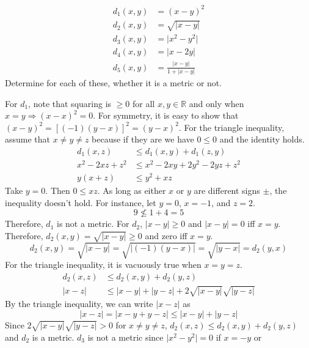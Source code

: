 \begin{enumerate}
  \begin{align*}
    d_1(x, y) & = (x - y)^2\\
    d_2(x, y) & = \sqrt{\lvert x - y\rvert}\\
    d_3(x, y) & = \lvert x^2 - y^2\rvert\\
    d_4(x, y) & = \lvert x - 2y\rvert\\
    d_5(x, y) & = \frac{\lvert x - y\rvert}{1 + \lvert x - y\rvert}
  \end{align*}
  Determine for each of these, whether it is a metric or not.
  \par\smallskip
  For \(d_1\), note that squaring is \(\geq 0\) for all \(x,y\in\mathbb{R}\)
  and only when \(x = y\Rightarrow (x - x)^2 = 0\).
  For symmetry, it is easy to show that
  \((x - y)^2 = [(-1)(y - x)]^2 = (y - x)^2\).
  For the triangle inequality, assume that \(x\neq y\neq z\) because if they
  are we have \(0\leq 0\) and the identity holds.
  \begin{align*}
    d_1(x, z) & \leq d_1(x, y) + d_1(z, y)\\
    x^2 - 2xz + z^2 & \leq x^2 - 2xy + 2y^2 -2yz + z^2\\
    y(x + z) & \leq y^2 + xz
  \end{align*}
  Take \(y = 0\).
  Then \(0\leq xz\).
  As long as either \(x\) or \(y\) are different signs \(\pm\), the inequality
  doesn't hold.
  For instance, let \(y = 0\), \(x = -1\), and \(z = 2\).
  \[
  9\not\leq 1 + 4 = 5
  \]
  Therefore, \(d_1\) is not a metric.
  For \(d_2\), \(\lvert x - y\rvert\geq 0\) and \(\lvert x - y\rvert = 0\) iff
  \(x = y\).
  Therefore, \(d_2(x,y) = \sqrt{\lvert x - y\rvert}\geq 0\) and zero iff
  \(x = y\).
  \[
  d_2(x, y) = \sqrt{\lvert x - y\rvert} = \sqrt{\lvert (-1)(y - x)\rvert} =
  \sqrt{\lvert y - x\rvert} = d_2(y, x)
  \]
  For the triangle inequality, it is vacuously true when \(x = y = z\).
  \begin{align*}
    d_2(x, z) & \leq d_2(x, y) + d_2(y, z)\\
    \lvert x - z\rvert & \leq \lvert x - y\rvert + \lvert y - z\rvert +
                         2\sqrt{\lvert x - y\rvert}\sqrt{\lvert y - z\rvert}
  \end{align*}
  By the triangle inequality, we can write \(\lvert x - z\rvert\) as
  \[
  \lvert x - z\rvert = \lvert x - y + y - z\rvert\leq\lvert x - y\rvert +
  \lvert y - z\rvert
  \]
  Since \(2\sqrt{\lvert x - y\rvert}\sqrt{\lvert y - z\rvert} > 0\) for
  \(x\neq y\neq z\), \(d_2(x,z)\leq d_2(x,y) + d_2(y,z)\) and \(d_2\) is a
  metric.
  \(d_3\) is not a metric since \(\lvert x^2 - y^2\rvert = 0\) if \(x = -y\) or

\end{enumerate}
